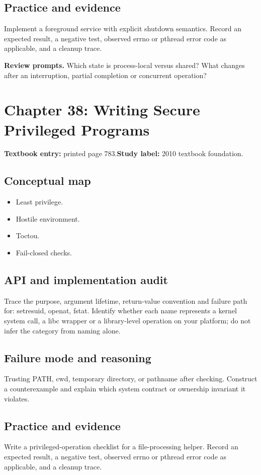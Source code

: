 \documentclass[11pt,letterpaper,oneside]{report}
\begin{document}
\subsection{Practice and evidence}
Implement a foreground service with explicit shutdown semantics. Record an expected result, a negative test, observed errno or pthread error code as applicable, and a cleanup trace.

\textbf{Review prompts.} Which state is process-local versus shared? What changes after an interruption, partial completion or concurrent operation?

\section{Chapter 38: Writing Secure Privileged Programs}
\textbf{Textbook entry:} printed page 783.\quad \textbf{Study label:} 2010 textbook foundation.

\subsection{Conceptual map}
\begin{itemize}
\item Least privilege.
\item Hostile environment.
\item Toctou.
\item Fail-closed checks.
\end{itemize}
\subsection{API and implementation audit}
Trace the purpose, argument lifetime, return-value convention and failure path for: setresuid, openat, fstat. Identify whether each name represents a kernel system call, a libc wrapper or a library-level operation on your platform; do not infer the category from naming alone.

\subsection{Failure mode and reasoning}
Trusting PATH, cwd, temporary directory, or pathname after checking. Construct a counterexample and explain which system contract or ownership invariant it violates.

\subsection{Practice and evidence}
Write a privileged-operation checklist for a file-processing helper. Record an expected result, a negative test, observed errno or pthread error code as applicable, and a cleanup trace.
\end{document}
